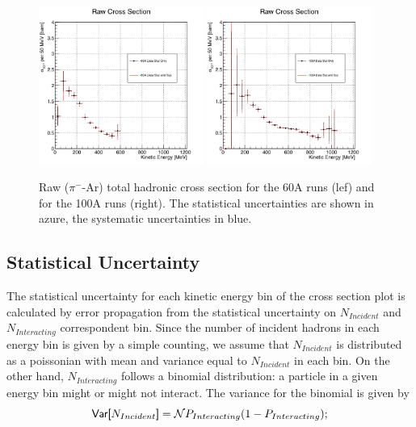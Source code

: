 \begin{figure}
\centering  
\includegraphics[width=0.48\textwidth]{Chapter-6/Images/Plots60A.png}
\includegraphics[width=0.48\textwidth]{Chapter-6/Images/Plots100A.png}
\caption{Raw ($\pi^-$-Ar) total hadronic cross section for the 60A runs (lef) and for the 100A runs (right). The statistical uncertainties are shown in azure, the systematic uncertainties in blue.}
\label{fig:XSRaw}
\end{figure}


\subsection{Statistical Uncertainty}\label{ch:StatUncertaintyXSRaw}
The statistical uncertainty for each kinetic energy bin of the cross section plot is calculated by error propagation from the statistical uncertainty on $N_{Incident}$ and $N_{Interacting}$ correspondent bin.  Since the number of incident hadrons in each energy bin is given by a simple counting, we assume that $N_{Incident}$ is distributed as a poissonian with mean and variance equal to $N_{Incident}$ in each bin.  
On the other hand, $N_{Interacting}$ follows a binomial distribution: a particle in a given energy bin might or might not interact.  The variance for the binomial is given by  
\begin{equation}
\text{\textsf{Var[$N_{Incident}$]}} = \mathcal{N}P_{Interacting}(1-P_{Interacting});
\label{eq:binVar}
\end{equation}

